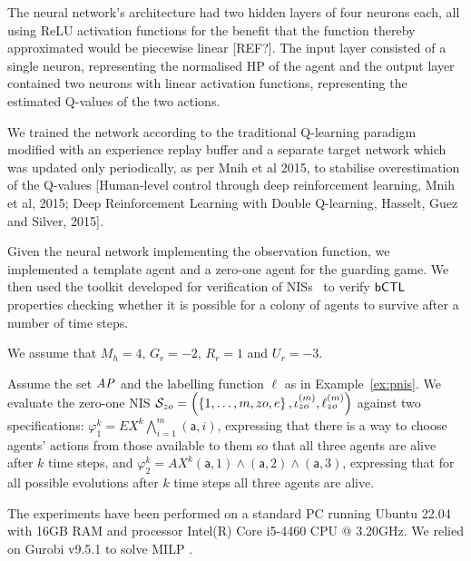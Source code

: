 The neural network's architecture had two hidden layers of four neurons each, all using ReLU activation functions for the benefit that the function thereby approximated would be piecewise linear [REF?]. The input layer consisted of a single neuron, representing the normalised HP of the agent and the output layer contained two neurons with linear activation functions, representing the estimated Q-values of the two actions. 

We trained the network according to the traditional Q-learning paradigm modified with an experience replay buffer and a separate target network which was updated only periodically, as per Mnih et al 2015, to stabilise overestimation of the Q-values [Human-level control through deep reinforcement learning, Mnih et al, 2015; Deep Reinforcement Learning with Double Q-learning, Hasselt, Guez and Silver, 2015]. 



Given the neural network implementing the observation function, we 
implemented a template agent and a zero-one agent for the guarding game. We
then used the \venmas toolkit developed for verification of
NISs~\cite{Akintunde+20b} to verify $\sf{bCTL}$ properties checking whether it is
possible for a colony of agents to survive after a number of time steps.

We assume that $M_h = 4$, $G_r = -2$, $R_r = 1$ and $U_r = -3$. 

Assume the set $\it{AP}$ and the labelling function $\ell$ as in
Example~\ref{ex:pnis}. We evaluate the zero-one NIS
$\mathcal S_{zo} = \left ( \left \{ 1,\ldots,m,zo,e \right \}, \iota^{({m})}_{zo}, \ell^{(m)}_{zo} \right )$
against two specifications:
$\varphi^k_1 = EX^k \bigwedge_{i=1}^m(\mathsf{a},i)$,
expressing that there is a way to choose agents' actions from those available
to them so that all three agents are alive after $k$ time steps, and
$\varphi^k_2 = AX^k (\mathsf{a},1) \land (\mathsf{a},2) \land (\mathsf{a},3)$,
expressing that for all possible evolutions after $k$ time steps all three
agents are alive.

The experiments have been performed on a standard PC running Ubuntu 22.04 with
16GB RAM and processor Intel(R) Core i5-4460 CPU @ 3.20GHz. We relied on Gurobi
v9.5.1 to solve MILP \cite{Gurobi+16a}.



